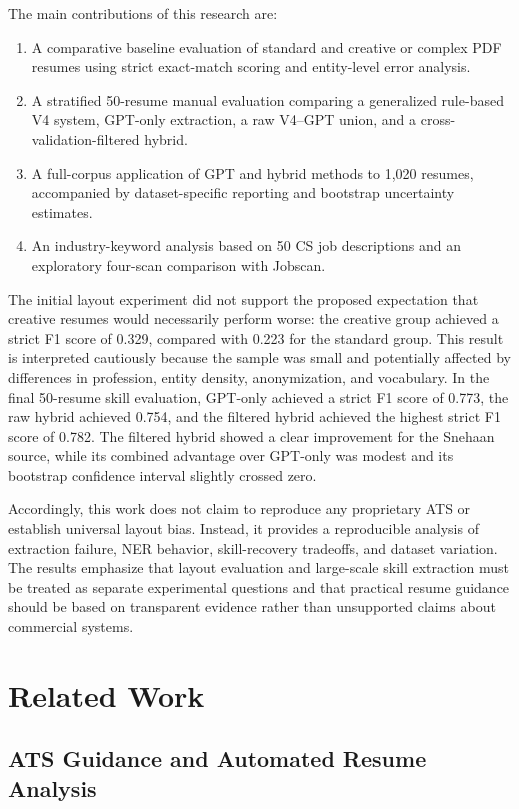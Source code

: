 \documentclass[conference]{IEEEtran}
\begin{document}
The main contributions of this research are:

\begin{enumerate}
    \item A comparative baseline evaluation of standard and creative or complex PDF resumes using strict exact-match scoring and entity-level error analysis.
    \item A stratified 50-resume manual evaluation comparing a generalized rule-based V4 system, GPT-only extraction, a raw V4--GPT union, and a cross-validation-filtered hybrid.
    \item A full-corpus application of GPT and hybrid methods to 1,020 resumes, accompanied by dataset-specific reporting and bootstrap uncertainty estimates.
    \item An industry-keyword analysis based on 50 CS job descriptions and an exploratory four-scan comparison with Jobscan.
\end{enumerate}

The initial layout experiment did not support the proposed expectation that creative resumes would necessarily perform worse: the creative group achieved a strict F1 score of 0.329, compared with 0.223 for the standard group. This result is interpreted cautiously because the sample was small and potentially affected by differences in profession, entity density, anonymization, and vocabulary. In the final 50-resume skill evaluation, GPT-only achieved a strict F1 score of 0.773, the raw hybrid achieved 0.754, and the filtered hybrid achieved the highest strict F1 score of 0.782. The filtered hybrid showed a clear improvement for the Snehaan source, while its combined advantage over GPT-only was modest and its bootstrap confidence interval slightly crossed zero.

Accordingly, this work does not claim to reproduce any proprietary ATS or establish universal layout bias. Instead, it provides a reproducible analysis of extraction failure, NER behavior, skill-recovery tradeoffs, and dataset variation. The results emphasize that layout evaluation and large-scale skill extraction must be treated as separate experimental questions and that practical resume guidance should be based on transparent evidence rather than unsupported claims about commercial systems.

\section{Related Work}

\subsection{ATS Guidance and Automated Resume Analysis}
\end{document}
